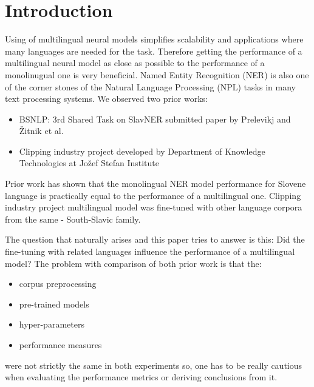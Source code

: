 \documentclass[sigconf]{acmart}
\begin{document}
\section{Introduction}
Using of multilingual neural models simplifies scalability and applications where many languages are needed for the task.
Therefore getting the performance of a multilingual neural model as close as possible to the performance of a monolinugual one is very beneficial.
Named Entity Recognition (NER) is also one of the corner stones of the Natural Language Processing (NPL) tasks in many text processing systems.
We observed two prior works:
\begin{itemize}
\item BSNLP: 3rd Shared Task on SlavNER\cite{piskorski-etal-2021-slav} submitted paper by Prelevikj and Žitnik et al.\cite{prelevikj-zitnik-2021-multilingual}
\item Clipping industry project developed by Department of Knowledge Technologies at Jožef Stefan Institute\cite{KTIJS}
\end{itemize}
Prior work has shown that the monolingual NER model performance for Slovene language is practically equal to the performance of a multilingual one.
Clipping industry project multilingual model was fine-tuned with other language corpora from the same - South-Slavic family.

The question that naturally arises and this paper tries to answer is this: Did the fine-tuning with related languages influence the performance of a multilingual model?
The problem with comparison of both prior work is that the:
\begin{itemize}
\item corpus preprocessing
\item pre-trained models
\item hyper-parameters
\item performance measures
\end{itemize}
were not strictly the same in both experiments so, one has to be really cautious when evaluating the performance metrics or deriving conclusions from it.
\end{document}

